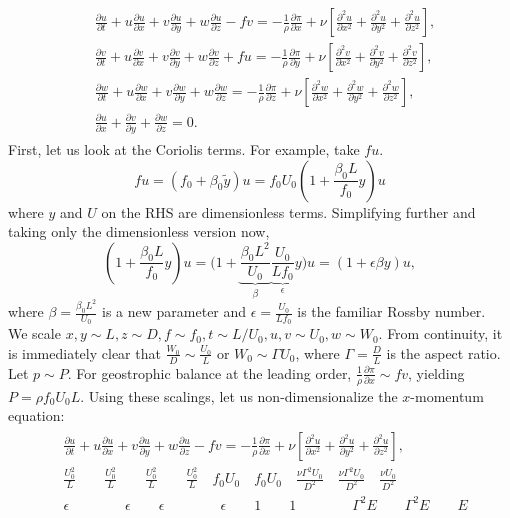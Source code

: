 \documentclass{article}
\newcommand{\pd}[2]{\frac{\partial{#1}}{\partial{#2}}}
\newcommand{\pdd}[2]{\frac{\partial^2{#1}}{\partial{#2}^2}}
\begin{document}
\begin{align}\label{eq:rotating-NS}
 \begin{split}
  & \pd{u}{t} + u \pd{u}{x} + v \pd{u}{y} + w\pd{u}{z} - fv = -\frac{1}{\rho} \pd{\pi}{x} + \nu\left[\pdd{u}{x} + \pdd{u}{y} + \pdd{u}{z}\right],\\
  & \pd{v}{t} + u \pd{v}{x} + v \pd{v}{y} + w\pd{v}{z} + fu = -\frac{1}{\rho} \pd{\pi}{y} + \nu\left[\pdd{v}{x} + \pdd{v}{y} + \pdd{v}{z}\right],\\
  & \pd{w}{t} + u \pd{w}{x} + v \pd{w}{y} + w\pd{w}{z}  = -\frac{1}{\rho} \pd{\pi}{z} + \nu\left[\pdd{w}{x} + \pdd{w}{y} + \pdd{w}{z}\right],\\
  & \pd{u}{x} + \pd{v}{y} + \pd{w}{z} = 0.
 \end{split}
\end{align}
 First, let us look at the Coriolis terms. For example, take $fu$. 
\begin{equation}
 f u = (f_{0}+\beta_{0}\tilde{y})u = f_{0}U_{0}\left(1 + \frac{\beta_{0} L}{f_{0}} y \right)u 
\end{equation}
where $y$ and $U$ on the RHS are dimensionless terms. Simplifying further and taking only the dimensionless version now, 
\begin{equation}
 \left(1 + \frac{\beta_{0} L}{f_{0}} y \right)u  = \bigg(1 + \underbrace{ \frac{\beta_{0} L^{2}}{U_{0}} }_{\beta} \underbrace{ \frac{U_{0}}{L f_{0}} }_{\epsilon} y \bigg)u = (1 + \epsilon \beta y) u, 
\end{equation}
where $\beta =  \frac{\beta_{0} L^{2}}{U_{0}} $ is a new parameter and $\epsilon =  \frac{U_{0}}{L f_{0}}$ is the familiar Rossby number.\\
%
We scale $x, y \sim L, z \sim D, f\sim f_{0}, t\sim L/U_{0}, u, v \sim U_{0}, w \sim W_{0}$. From continuity, it is immediately clear that $\frac{W_{0}}{D} \sim \frac{U_{0}}{L}$ or $W_{0} \sim \Gamma U_{0}$, where $\Gamma = \frac{D}{L}$ is the aspect ratio. \\
%
Let $p \sim P$. For geostrophic balance at the leading order, $\frac{1}{\rho} \frac{\partial \pi}{\partial x} \sim f v$, yielding $\boxed{P = \rho f_{0} U_{0} L}$.
%
Using these scalings, let us non-dimensionalize the $x$-momentum equation:
\begin{align}
 \begin{split}
  & \pd{u}{t} + u \pd{u}{x} + v \pd{u}{y} + w\pd{u}{z} - fv = -\frac{1}{\rho} \pd{\pi}{x} + \nu\left[\pdd{u}{x} + \pdd{u}{y} + \pdd{u}{z}\right],\\
  &\frac{U_{0}^{2}}{L} \quad \quad \frac{U_{0}^{2}}{L} \quad \quad  \frac{U_{0}^{2}}{L} \quad \quad \frac{U_{0}^{2}}{L} \quad f_{0}U_{0} \quad f_{0}U_{0} \quad \frac{\nu \Gamma^{2}U_{0}}{D^{2}} \quad \frac{\nu \Gamma^{2}U_{0}}{D^{2}} \quad \frac{\nu U_{0}}{D^{2}} \\
  & \epsilon \qquad \qquad \epsilon \qquad\epsilon \qquad \qquad \epsilon \qquad 1 \qquad 1 \qquad \qquad \Gamma^{2}E \qquad  \Gamma^{2}E \qquad  E 
 \end{split}
\end{align}
\end{document}
